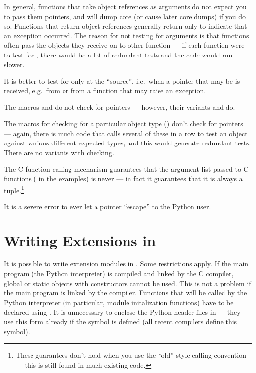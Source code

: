 \documentclass{manual}
\begin{document}
In general, functions that take object references as arguments do not
expect you to pass them \NULL{} pointers, and will dump core (or
cause later core dumps) if you do so.  Functions that return object
references generally return \NULL{} only to indicate that an
exception occurred.  The reason for not testing for \NULL{}
arguments is that functions often pass the objects they receive on to
other function --- if each function were to test for \NULL{},
there would be a lot of redundant tests and the code would run slower.

It is better to test for \NULL{} only at the ``source'', i.e.\ when a
pointer that may be \NULL{} is received, e.g.\ from
 or from a function that may raise an exception.

The macros  and 
do not check for \NULL{} pointers --- however, their variants
 and  do.

The macros for checking for a particular object type
() don't check for \NULL{} pointers ---
again, there is much code that calls several of these in a row to test
an object against various different expected types, and this would
generate redundant tests.  There are no variants with \NULL{}
checking.

The C function calling mechanism guarantees that the argument list
passed to C functions ( in the examples) is never
\NULL{} --- in fact it guarantees that it is always a tuple.\footnote{
These guarantees don't hold when you use the ``old'' style
calling convention --- this is still found in much existing code.}

It is a severe error to ever let a \NULL{} pointer ``escape'' to
the Python user.  


\section{Writing Extensions in \Cpp{}
         \label{cplusplus}}

It is possible to write extension modules in \Cpp{}.  Some restrictions
apply.  If the main program (the Python interpreter) is compiled and
linked by the C compiler, global or static objects with constructors
cannot be used.  This is not a problem if the main program is linked
by the \Cpp{} compiler.  Functions that will be called by the
Python interpreter (in particular, module initalization functions)
have to be declared using .
It is unnecessary to enclose the Python header files in
 --- they use this form already if the symbol
 is defined (all recent \Cpp{} compilers define this
symbol).
\end{document}
